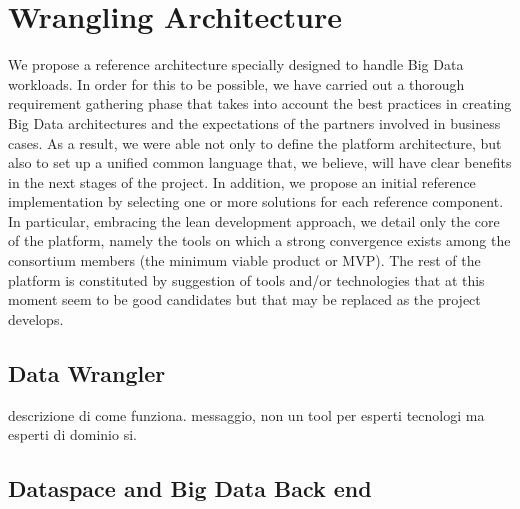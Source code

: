 \section{Wrangling Architecture}

We propose a reference architecture specially designed to handle Big Data workloads. 
In order for this to be possible, we have carried out a thorough requirement gathering phase that takes into account the best practices in creating Big Data architectures and the expectations of the partners involved in business cases. As a result, we were able not only to define the platform architecture, but also to set up a unified common language that, we believe, will have clear benefits in the next stages of the project.
In addition, we propose an initial reference implementation by selecting one or more solutions for each reference component. In particular, embracing the lean development approach, we detail only the core of the platform, namely the tools on which a strong convergence exists among the consortium members (the minimum viable product or MVP). The rest of the platform is constituted by suggestion of tools and/or technologies that at this moment seem to be good candidates but that may be replaced as the project develops. 


\subsection{Data Wrangler}
descrizione di come funziona.
messaggio, non un tool per esperti tecnologi ma esperti di dominio si.

\subsection{Dataspace and Big Data Back end}
